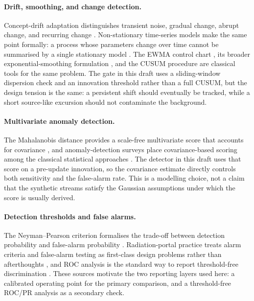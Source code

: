 \documentclass[11pt]{article}
\begin{document}
\paragraph{Drift, smoothing, and change detection.}
Concept-drift adaptation distinguishes transient noise, gradual change, abrupt change, and recurring change \citep{gama2014survey}. Non-stationary time-series models make the same point formally: a process whose parameters change over time cannot be summarised by a single stationary model \citep{dahlhaus1997fitting}. The EWMA control chart \citep{roberts1959control}, its broader exponential-smoothing formulation \citep{gardner1985exponential}, and the CUSUM procedure \citep{page1954continuous} are classical tools for the same problem. The gate in this draft uses a sliding-window dispersion check and an innovation threshold rather than a full CUSUM, but the design tension is the same: a persistent shift should eventually be tracked, while a short source-like excursion should not contaminate the background.

\paragraph{Multivariate anomaly detection.}
The Mahalanobis distance provides a scale-free multivariate score that accounts for covariance \citep{mahalanobis1936distance}, and anomaly-detection surveys place covariance-based scoring among the classical statistical approaches \citep{chandola2009anomaly}. The detector in this draft uses that score on a pre-update innovation, so the covariance estimate directly controls both sensitivity and the false-alarm rate. This is a modelling choice, not a claim that the synthetic streams satisfy the Gaussian assumptions under which the score is usually derived.

\paragraph{Detection thresholds and false alarms.}
The Neyman--Pearson criterion formalises the trade-off between detection probability and false-alarm probability \citep{neyman1933problem}. Radiation-portal practice treats alarm criteria and false-alarm testing as first-class design problems rather than afterthoughts \citep{burr2007alarm,leber2020false}, and ROC analysis is the standard way to report threshold-free discrimination \citep{fawcett2006roc}. These sources motivate the two reporting layers used here: a calibrated operating point for the primary comparison, and a threshold-free ROC/PR analysis as a secondary check.
\end{document}
